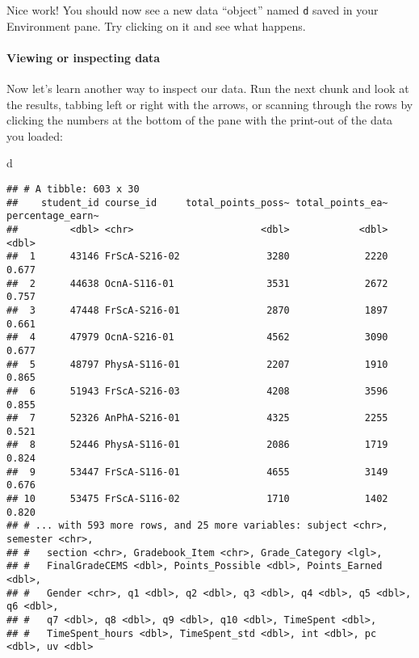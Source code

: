 \documentclass[
]{article}
\newenvironment{Shaded}{\begin{snugshade}}{\end{snugshade}}
\newcommand{\NormalTok}[1]{#1}
\begin{document}
Nice work! You should now see a new data ``object'' named \texttt{d}
saved in your Environment pane. Try clicking on it and see what happens.

\hypertarget{viewing-or-inspecting-data}{%
\paragraph{Viewing or inspecting
data}\label{viewing-or-inspecting-data}}

Now let's learn another way to inspect our data. Run the next chunk and
look at the results, tabbing left or right with the arrows, or scanning
through the rows by clicking the numbers at the bottom of the pane with
the print-out of the data you loaded:

\begin{Shaded}
\begin{Highlighting}[]
\NormalTok{d}
\end{Highlighting}
\end{Shaded}

\begin{verbatim}
## # A tibble: 603 x 30
##    student_id course_id     total_points_poss~ total_points_ea~ percentage_earn~
##         <dbl> <chr>                      <dbl>            <dbl>            <dbl>
##  1      43146 FrScA-S216-02               3280             2220            0.677
##  2      44638 OcnA-S116-01                3531             2672            0.757
##  3      47448 FrScA-S216-01               2870             1897            0.661
##  4      47979 OcnA-S216-01                4562             3090            0.677
##  5      48797 PhysA-S116-01               2207             1910            0.865
##  6      51943 FrScA-S216-03               4208             3596            0.855
##  7      52326 AnPhA-S216-01               4325             2255            0.521
##  8      52446 PhysA-S116-01               2086             1719            0.824
##  9      53447 FrScA-S116-01               4655             3149            0.676
## 10      53475 FrScA-S116-02               1710             1402            0.820
## # ... with 593 more rows, and 25 more variables: subject <chr>, semester <chr>,
## #   section <chr>, Gradebook_Item <chr>, Grade_Category <lgl>,
## #   FinalGradeCEMS <dbl>, Points_Possible <dbl>, Points_Earned <dbl>,
## #   Gender <chr>, q1 <dbl>, q2 <dbl>, q3 <dbl>, q4 <dbl>, q5 <dbl>, q6 <dbl>,
## #   q7 <dbl>, q8 <dbl>, q9 <dbl>, q10 <dbl>, TimeSpent <dbl>,
## #   TimeSpent_hours <dbl>, TimeSpent_std <dbl>, int <dbl>, pc <dbl>, uv <dbl>
\end{verbatim}
\end{document}
